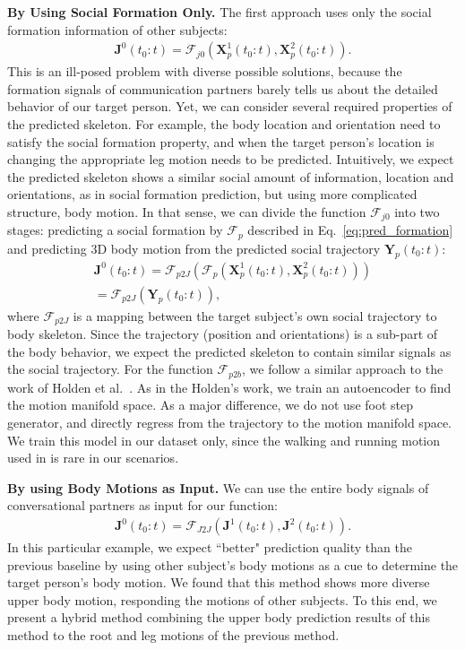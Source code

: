 \textbf{By Using Social Formation Only.} The first approach uses only the social formation information of other subjects:
\begin{gather}	
\mathbf{J}^0(t_0:t) = \mathcal{F}_{j0} ( \mathbf{X}_p^1(t_0:t), \mathbf{X}_p^2(t_0:t) ).
\end{gather}
This is an ill-posed problem with diverse possible solutions, because the formation signals of communication partners barely tells us about the detailed behavior of our target person. Yet, we can consider several required properties of the predicted skeleton. For example, the body location and orientation need to satisfy the social formation property, and when the target person's location is changing the appropriate leg motion needs to be predicted. Intuitively, we expect the predicted skeleton shows a similar social amount of information, location and orientations, as in social formation prediction, but using more complicated structure, body motion. In that sense, we can divide the function $\mathcal{F}_{j0}$ into two stages: predicting a social formation by $\mathcal{F}_p$ described in Eq.~\ref{eq:pred_formation} and predicting 3D body motion from the predicted social trajectory $\mathbf{Y}_p (t_0:t)$:
\begin{gather}	
 \mathbf{J}^0 (t_0:t) = \mathcal{F}_{p2J} \left(   \mathcal{F}_p \left( \mathbf{X}_p^1(t_0:t), \mathbf{X}_p^2(t_0:t) \right) \right) \nonumber \\ 
 = \mathcal{F}_{p2J} \left( \mathbf{Y}_p (t_0:t)  \right),
 \label{eq:pred_p2J}
\end{gather}
where $\mathcal{F}_{p2J}$ is a mapping between the target subject's own social trajectory to body skeleton. Since the trajectory (position and orientations) is a sub-part of the body behavior, we expect the predicted skeleton to contain similar signals as the social trajectory. For the function $\mathcal{F}_{p2b}$, we follow a similar approach to the work of Holden et al.~\cite{holden2016deep}. As in the Holden's work, we train an autoencoder to find the motion manifold space. As a major difference, we do not use foot step generator, and directly regress from the trajectory to the motion manifold space. We train this model in our dataset only, since the walking and running motion used in \cite{holden2016deep} is rare in our scenarios. 

\textbf{By using Body Motions as Input.} We can use the entire body signals of conversational partners as input for our function:
\begin{gather}	
\mathbf{J}^0 (t_0:t) = \mathcal{F}_{J2J} \left( \mathbf{J}^1 (t_0:t), \mathbf{J}^2 (t_0:t) \right) .
\end{gather}
In this particular example, we expect ``better" prediction quality than the previous baseline by using other subject's body motions as a cue to determine the target person's body motion. We found that this method shows more diverse upper body motion, responding the motions of other subjects. To this end, we present a hybrid method combining the upper body prediction results of this method to the root and leg motions of the previous method. 


